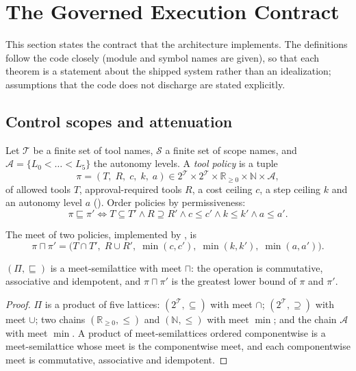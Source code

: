 \section{The Governed Execution Contract}
\label{sec:formal}
This section states the contract that the architecture implements. The definitions follow the code closely (module and symbol names are given), so that each theorem is a statement about the shipped system rather than an idealization; assumptions that the code does not discharge are stated explicitly.

\subsection{Control scopes and attenuation}
Let $\mathcal{T}$ be a finite set of tool names, $\mathcal{S}$ a finite set of scope names, and $\mathcal{A}=\{L_0<\dots<L_5\}$ the autonomy levels. A \emph{tool policy} is a tuple
\begin{equation}
 \pi=(T,\;R,\;c,\;k,\;a)\in 2^{\mathcal{T}}\times 2^{\mathcal{T}}\times\mathbb{R}_{\ge0}\times\mathbb{N}\times\mathcal{A},
\end{equation}
of allowed tools $T$, approval-required tools $R$, a cost ceiling $c$, a step ceiling $k$ and an autonomy level $a$ (). Order policies by permissiveness:
\begin{equation}
 \pi\sqsubseteq\pi' \iff T\subseteq T' \wedge R\supseteq R' \wedge c\le c' \wedge k\le k' \wedge a\le a'.
\end{equation}

\begin{definition}[Attenuation]
The meet of two policies, implemented by , is
\[\pi\sqcap\pi'=\bigl(T\cap T',\;R\cup R',\;\min(c,c'),\;\min(k,k'),\;\min(a,a')\bigr).\]
\end{definition}

\begin{lemma}
$(\Pi,\sqsubseteq)$ is a meet-semilattice with meet $\sqcap$: the operation is commutative, associative and idempotent, and $\pi\sqcap\pi'$ is the greatest lower bound of $\pi$ and $\pi'$.
\end{lemma}
\begin{proof}
$\Pi$ is a product of five lattices: $(2^{\mathcal{T}},\subseteq)$ with meet $\cap$; $(2^{\mathcal{T}},\supseteq)$ with meet $\cup$; two chains $(\mathbb{R}_{\ge0},\le)$ and $(\mathbb{N},\le)$ with meet $\min$; and the chain $\mathcal{A}$ with meet $\min$. A product of meet-semilattices ordered componentwise is a meet-semilattice whose meet is the componentwise meet, and each componentwise meet is commutative, associative and idempotent.
\end{proof}

